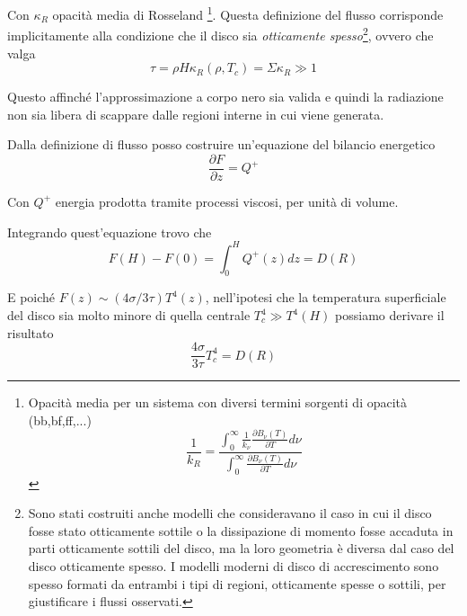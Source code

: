 \documentclass[a4paperbi]{article}
\begin{document}
	Con $\kappa_R$ opacità media di Rosseland
	\footnote{Opacità media per un sistema con diversi termini sorgenti di opacità (bb,bf,ff,...)\begin{equation}
																							\frac{1}{k_R}=\frac{\int_0^\infty\frac{1}{k_\nu}\frac{\partial B_\nu(T)}{\partial T}d\nu}{\int_0^\infty\frac{\partial B_\nu(T)}{\partial T}d\nu}
																						\end{equation}}.
Questa definizione del flusso corrisponde implicitamente alla condizione che il disco sia \textit{otticamente spesso}\footnote{Sono stati costruiti anche modelli che consideravano il caso in cui il disco fosse stato otticamente sottile o la dissipazione di momento fosse accaduta in parti otticamente sottili del disco, ma la loro geometria è diversa dal caso del disco otticamente spesso. I modelli moderni di disco di accrescimento sono spesso formati da entrambi i tipi di regioni, otticamente spesse o sottili, per giustificare i flussi osservati.}, ovvero che valga
	\begin{equation}
		\tau=\rho H\kappa_R(\rho,T_c)=\Sigma\kappa_R\gg 1
	\end{equation}
	
	Questo affinché l'approssimazione a corpo nero sia valida e quindi la radiazione non sia libera di scappare dalle regioni interne in cui viene generata.
	
	Dalla definizione di flusso posso costruire un'equazione del bilancio energetico
	\begin{equation}
		\frac{\partial F}{\partial z}=Q^+
	\end{equation}

	Con $Q^+$ energia prodotta tramite processi viscosi, per unità di volume.
	
	Integrando quest'equazione trovo che
	\begin{equation}
		F(H)-F(0)=\int_0^HQ^+(z)dz=D(R)
	\end{equation}

	E poiché $F(z)\sim(4\sigma/3\tau)T^4(z)$, nell'ipotesi che la temperatura superficiale del disco sia molto minore di quella centrale $T_c^4\gg T^4(H)$
	possiamo derivare il risultato
	\begin{equation}
		\frac{4\sigma}{3\tau}T^4_c=D(R)
	\end{equation}
	
\end{document}
